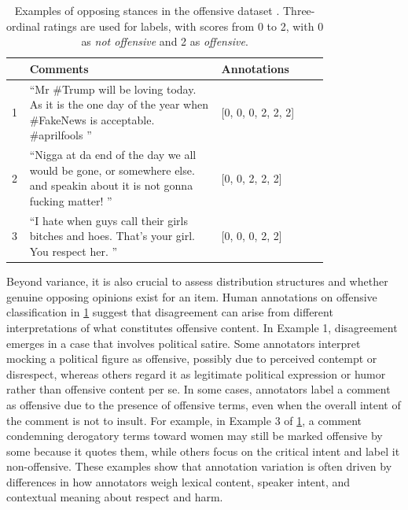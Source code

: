 \documentclass{article} %
\begin{document}
\begin{table}{}
\centering
\footnotesize
\renewcommand{\arraystretch}{2.2} %
\begin{tabular}  {p{0.02\linewidth} p{0.5\linewidth} p{0.28\linewidth}}
\toprule
 & \textbf{Comments} & \textbf{Annotations} \\ \hline


1 & \textquotedblleft Mr \#Trump will be loving today. As it is the one day of the year when \#FakeNews is acceptable. \#aprilfools \textquotedblright
& [0, 0, 0, 2, 2, 2] \\ \hline

2 & \textquotedblleft Nigga at da end of the day we all would be gone, or somewhere else. and speakin about it is not gonna fucking matter! \textquotedblright
& [0, 0, 2, 2, 2] \\ \hline

3 & \textquotedblleft I hate when guys call their girls bitches and hoes. That's your girl. You respect her. \textquotedblright
& [0, 0, 0, 2, 2] \\ \bottomrule

\end{tabular}
\vspace{0.2cm}
\caption{Examples of opposing stances in the offensive dataset \citep{sap-etal-2020-social}. Three-ordinal ratings are used for labels, with scores from 0 to 2, with 0 as \textit{not offensive} and 2 as \textit{offensive}.}
\vspace{0.12cm}
\label{tab:offensive-annotations}
\end{table}

Beyond variance, it is also crucial to assess distribution structures \citep{akhtar2021whose, van2001measuring} and whether genuine opposing opinions exist for an item. Human annotations on offensive classification in \cref{tab:offensive-annotations} suggest that disagreement can arise from different interpretations of what constitutes offensive content. In Example 1, disagreement emerges in a case that involves political satire. Some annotators interpret mocking a political figure as offensive, possibly due to perceived contempt or disrespect, whereas others regard it as legitimate political expression or humor rather than offensive content per se. In some cases, annotators label a comment as offensive due to the presence of offensive terms, even when the overall intent of the comment is not to insult. For example, in Example 3 of \cref{tab:offensive-annotations}, a comment condemning derogatory terms toward women may still be marked offensive by some because it quotes them, while others focus on the critical intent and label it non-offensive. These examples show that annotation variation is often driven by differences in how annotators weigh lexical content, speaker intent, and contextual meaning about respect and harm.
\end{document}
